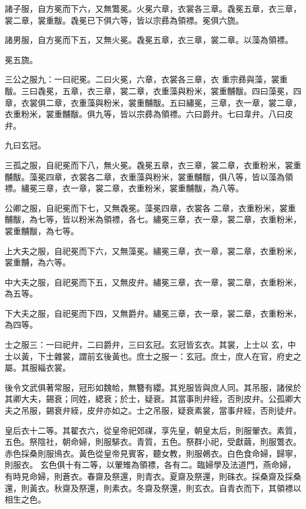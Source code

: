 \begin{pinyinscope}
 諸子服，自方冕而下六，又無鷩冕。火冕六章，衣裳各三章。毳冕五章，衣三章，裳二章，裳重黻。毳冕已下俱六等，皆以宗彞為領褾。冕俱六旒。



 諸男服，自方冕而下五，又無火冕。毳冕五章，衣三章，裳二章。以藻為領褾。



 冕五旒。



 三公之服九：一曰祀冕。二曰火冕，六章，衣裳各三章，衣
 重宗彞與藻，裳重黻。三曰毳冕，五章，衣三章，裳二章，衣重藻與粉米，裳重黼黻。四曰藻冕，四章，衣裳俱二章，衣重藻與粉米，裳重黼黻。五曰繡冕，三章，衣一章，裳二章，衣重粉米，裳重黼黻。俱九等，皆以宗彞為領褾。六曰爵弁。七曰韋弁。八曰皮弁。



 九曰玄冠。



 三孤之服，自祀冕而下八，無火冕。毳冕五章，衣三章，裳二章，衣重粉米，裳重黼黻。藻冕四章，衣裳各二章，衣重藻與粉米，裳重黼黻，俱八等，皆以藻為領褾。繡冕三章，衣一章，裳二章，衣重粉米，裳重黼黻，為八等。



 公卿之服，自祀冕而下七，又無毳冕。藻冕四章，衣裳各
 二章，衣重粉米，裳重黼黻，為七等，皆以粉米為領褾，各七。繡冕三章，衣一章，裳二章，衣重粉米，裳重黼黻，為七等。



 上大夫之服，自祀冕而下六，又無藻冕。繡冕三章，衣一章，裳二章，衣重粉米，裳重黼，為六等。



 中大夫之服，自祀冕而下五，又無皮弁。繡冕三章，衣一章，裳二章，衣重粉米，為五等。



 下大夫之服，自祀冕而下四，又無爵弁。繡冕三章，衣一章，裳二章，衣重粉米，為四等。



 士之服三：一曰祀弁，二曰爵弁，三曰玄冠。玄冠皆玄衣。其裳，上士以
 玄，中士以黃，下士雜裳，謂前玄後黃也。庶士之服一：玄冠。庶士，庶人在官，府史之屬。其服緇衣裳。



 後令文武俱著常服，冠形如魏帢，無簪有纓。其兇服皆與庶人同。其吊服，諸侯於其卿大夫，錫衰；同姓，緦衰；於士，疑衰。其當事則弁絰，否則皮弁。公孤卿大夫之吊服，錫衰弁絰，皮弁亦如之。士之吊服，疑衰素裳，當事弁絰，否則徒弁。



 皇后衣十二等。其翟衣六，從皇帝祀郊禖，享先皇，朝皇太后，則服翬衣。素質，五色。祭陰社，朝命婦，則服騑衣。青質，五色。祭群小祀，受獻繭，則服鷩衣。赤色採桑則服鳪衣。黃色從皇帝見賓客，聽女教，則服鵫衣。白色食命婦，歸寧，則服衣。
 玄色俱十有二等，以翬雉為領褾，各有二。臨婦學及法道門，燕命婦，有時見命婦，則蒼衣。春齋及祭還，則青衣。夏齋及祭還，則硃衣。採桑齋及採桑還，則黃衣。秋齋及祭還，則素衣。冬齋及祭還，則玄衣。自青衣而下，其領褾以相生之色。




\end{pinyinscope}
